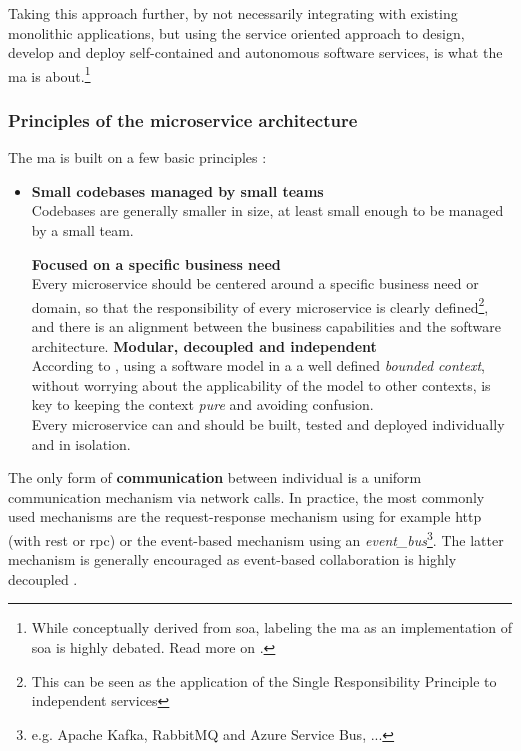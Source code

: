 Taking this approach further, by not necessarily integrating with existing
monolithic applications, but using the service oriented approach to design,
develop and deploy self-contained and autonomous software services, is what the
\gls{ma} is about.\footnote{While conceptually derived from \gls{soa}, labeling
the \gls{ma} as an implementation of \gls{soa} is highly debated. Read more on
.}




\subsubsection{Principles of the microservice architecture}

The \gls{ma} is built on a few basic principles \autocite{Dragoni_etal_2018}
\autocite{Dragoni_etal_2017} \autocite{Fowler_Microservices_2014}
\autocite{Gysels_2020} \autocite{Newman_2015}:

\begin{itemize}
    \item \textbf{Small codebases managed by small teams}\\
    Codebases are generally smaller in size, at least small enough to be managed
    by a small team. 

    \spacedItem \textbf{Focused on a specific business need}\\
    Every \gls{microservice} should be centered around a specific business need
    or domain, so that the responsibility of every \gls{microservice} is clearly
    defined\footnote{This can be seen as the application of the Single
    Responsibility Principle to independent services}, and there is an alignment
    between the business capabilities and the software architecture. 
    \spacedItem \textbf{Modular, decoupled and independent}\\
    According to \textcite{Evans_2004}, using a software model in a a well
    defined \textit{bounded context}, without worrying about the applicability
    of the model to other contexts, is key to keeping the context \textit{pure}
    and avoiding confusion.\\
    Every \gls{microservice} can and should be built, tested and deployed
    individually and in isolation. 
\end{itemize}

The only form of \textbf{communication} between individual
 is a uniform communication mechanism via network calls.
In practice, the most commonly used mechanisms are the request-response
mechanism using for example \gls{http} (with \gls{rest} or \gls{rpc}) or the
event-based mechanism using an \textit{\gls{event_bus}}\footnote{e.g. Apache
Kafka, RabbitMQ and Azure Service Bus, ...}. The latter mechanism is generally
encouraged as event-based collaboration is highly decoupled
\autocite{Newman_2015}.


